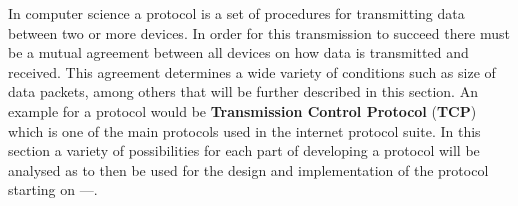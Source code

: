 In computer science a protocol is a set of procedures for transmitting data between two or more devices.
In order for this transmission to succeed there must be a mutual agreement between all devices on how data is transmitted and received.
This agreement determines a wide variety of conditions such as size of data packets, among others that will be further described in this section.
An example for a protocol would be \textbf{Transmission Control Protocol} (\textbf{TCP}) which is one of the main protocols used in the internet protocol suite.
In this section a variety of possibilities for each part of developing a protocol will be analysed as to then be used for the design and implementation of the protocol starting on ---.